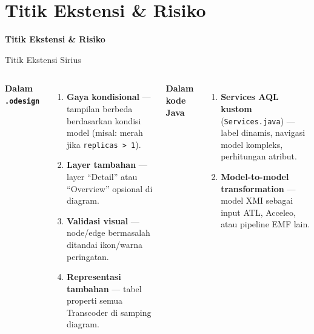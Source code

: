 \documentclass[aspectratio=169, table]{beamer}
\begin{document}
\section{Titik Ekstensi \& Risiko}
\begin{frame}{\hfill}
	\centering
	\Huge{\textbf{Titik Ekstensi \& Risiko}}
\end{frame}

\begin{frame}{Titik Ekstensi Sirius}
\vspace{6pt}
\begin{columns}[T]
\textbf{Dalam \texttt{.odesign}}
\begin{enumerate}
  \item \textbf{Gaya kondisional} --- tampilan berbeda berdasarkan kondisi model (misal: merah jika \texttt{replicas > 1}).
  \item \textbf{Layer tambahan} --- layer ``Detail'' atau ``Overview'' opsional di diagram.
  \item \textbf{Validasi visual} --- node/edge bermasalah ditandai ikon/warna peringatan.
  \item \textbf{Representasi tambahan} --- tabel properti semua Transcoder di samping diagram.
\end{enumerate}

\textbf{Dalam kode Java}
\begin{enumerate}
  \item \textbf{Services AQL kustom} (\texttt{Services.java}) --- label dinamis, navigasi model kompleks, perhitungan atribut.
  \item \textbf{Model-to-model transformation} --- model XMI sebagai input ATL, Acceleo, atau pipeline EMF lain.
\end{enumerate}
\end{columns}
\end{frame}
\end{document}
